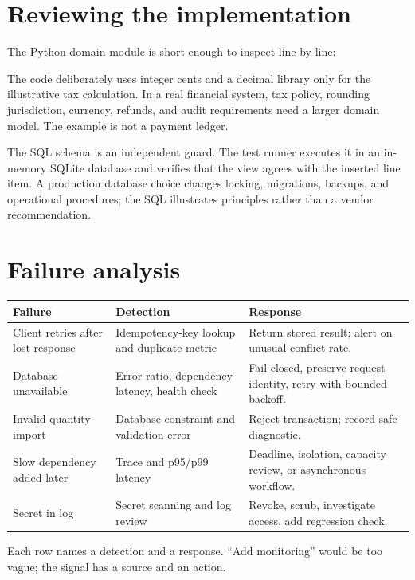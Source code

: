 \section{Reviewing the implementation}
The Python domain module is short enough to inspect line by line:



The code deliberately uses integer cents and a decimal library only for the
illustrative tax calculation. In a real financial system, tax policy, rounding
jurisdiction, currency, refunds, and audit requirements need a larger domain
model. The example is not a payment ledger.

The SQL schema is an independent guard. The test runner executes it in an
in-memory SQLite database and verifies that the view agrees with the inserted
line item. A production database choice changes locking, migrations, backups,
and operational procedures; the SQL illustrates principles rather than a vendor
recommendation.

\section{Failure analysis}
\noindent\begin{tabularx}{\textwidth}{@{}p{}p{}X@{}}
\toprule
Failure & Detection & Response \\
\midrule
Client retries after lost response & Idempotency-key lookup and duplicate metric & Return stored result; alert on unusual conflict rate. \\
Database unavailable & Error ratio, dependency latency, health check & Fail closed, preserve request identity, retry with bounded backoff. \\
Invalid quantity import & Database constraint and validation error & Reject transaction; record safe diagnostic. \\
Slow dependency added later & Trace and p95/p99 latency & Deadline, isolation, capacity review, or asynchronous workflow. \\
Secret in log & Secret scanning and log review & Revoke, scrub, investigate access, add regression check. \\
\bottomrule
\end{tabularx}

Each row names a detection and a response. “Add monitoring” would be too vague;
the signal has a source and an action.

